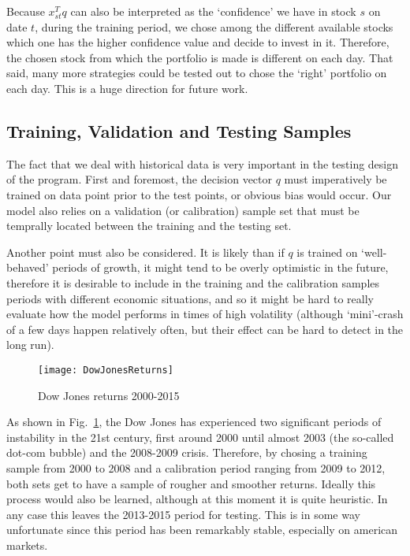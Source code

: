 \documentclass[11pt,fleqn]{article}
\newcommand{\figref}[1]{Fig.~\ref{#1}}
\begin{document}
Because $x_{st}^Tq$ can also be interpreted as the `confidence' we have in stock $s$ on
date $t$, during the training period, we chose among the different available stocks which
one has the higher confidence value and decide to invest in it. Therefore, the chosen
stock from which the portfolio is made is different on each day. That said, many more
strategies could be tested out to chose the `right' portfolio on each day. This is a huge
direction for future work.


\subsection{Training, Validation and Testing Samples}

The fact that we deal with historical data is very important in the testing design of the
program. First and foremost, the decision vector $q$ must imperatively be trained on data
point prior to the test points, or obvious bias would occur. Our model also relies on a
validation (or calibration) sample set that must be temprally located between the training
and the testing set.

Another point must also be considered. It is likely than if $q$ is trained on
`well-behaved' periods of growth, it might tend to be overly optimistic in the future,
therefore it is desirable to include in the training and the calibration samples periods
with different economic situations, and so it might be hard to really evaluate how the
model performs in times of high volatility (although `mini'-crash of a few days happen
relatively often, but their effect can be hard to detect in the long run).

\begin{figure}
  \centering
  \texttt{[image: DowJonesReturns]}
  \caption{Dow Jones returns 2000-2015}
  \label{fig:dowjonesreturns}
\end{figure}

As shown in \figref{fig:dowjonesreturns}, the Dow Jones has experienced two significant
periods of instability in the 21st century, first around 2000 until almost 2003 (the
so-called dot-com bubble) and the 2008-2009 crisis. Therefore, by chosing a training
sample from 2000 to 2008 and a calibration period ranging from 2009 to 2012, both sets get
to have a sample of rougher and smoother returns. Ideally this process would also be
learned, although at this moment it is quite heuristic. In any case this leaves the
2013-2015 period for testing. This is in some way unfortunate since this period has been
remarkably stable, especially on american markets.
\end{document}
